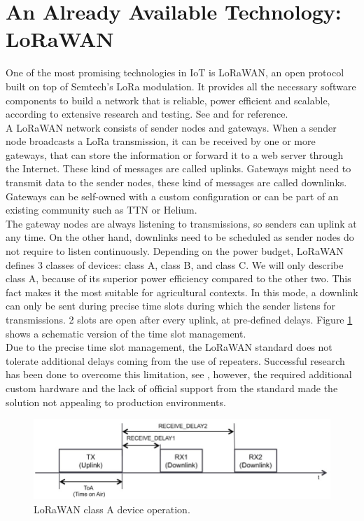 \section{An Already Available Technology: LoRaWAN}
One of the most promising technologies in \gls{IoT} is \gls{LoRaWAN}, an open protocol built on top of
Semtech's LoRa modulation. It provides all the necessary software components to build a network
that is reliable, power efficient and scalable, according to extensive research and testing. See
\cite{lorawan_agriculture_1} and \cite{lorawan_agriculture_2} for reference.\\
A LoRaWAN network consists of sender nodes and gateways. When a sender node broadcasts a LoRa transmission, it can be
received by one or more gateways, that can store the information or forward it to a web server through the Internet.
These kind of messages are called uplinks. Gateways might need to transmit data to the sender nodes, these kind of messages
are called downlinks. Gateways can be self-owned with a custom configuration or can be part of an existing community
such as \gls{TTN} or Helium.\\
The gateway nodes are always listening to transmissions, so senders can uplink at any time. On the other hand, downlinks
need to be scheduled as sender nodes do not require to listen continuously. Depending on the power budget,
LoRaWAN defines 3 classes of devices: class A, class B, and class C. We will only describe class A, because of
its superior power efficiency compared to the other two. This fact makes it the most suitable for agricultural contexts.
In this mode, a downlink can only be sent during precise time slots during which the sender listens for transmissions.
2 slots are open after every uplink, at pre-defined delays. Figure \ref{img: lorawan class a} shows a schematic version
of the time slot management.\\
Due to the precise time slot management, the LoRaWAN standard does not tolerate additional delays coming from the
use of repeaters. Successful research has been done to overcome this limitation, see \cite{lorawan_range_extender},
however, the required additional custom hardware and the lack of official support from the standard made the solution not
appealing to production environments.

\begin{figure}[ht]
    \centering
    \includegraphics[width=\linewidth]{images/lorawan_class_a.png}
    \caption{LoRaWAN class A device operation.}
    \label{img: lorawan class a}
\end{figure}

